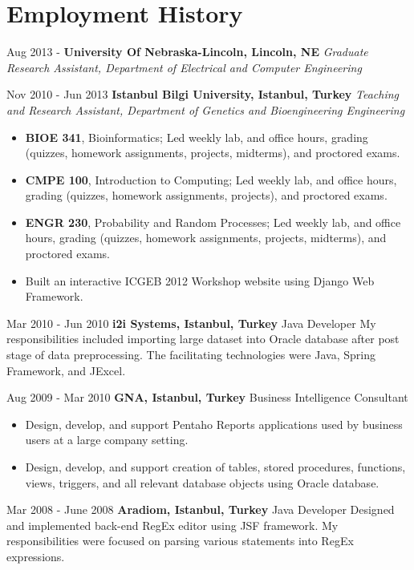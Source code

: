 \documentclass[showupdate]{xqcv}
\begin{document}
\section{Employment History}
\begin{entrylist}
  \hentry
  {Aug 2013 -}
  {\textbf{University Of Nebraska-Lincoln, Lincoln, NE}}
  {\textit{Graduate Research Assistant, Department of Electrical and Computer Engineering}}
  {}

  \hentry
  {Nov 2010 - Jun 2013}
  {\textbf{Istanbul Bilgi University, Istanbul, Turkey}}
  {\textit{Teaching and Research Assistant, Department of Genetics and Bioengineering Engineering}}
  {
    \begin{itemize}
      \item \textbf{BIOE 341}, Bioinformatics; Led weekly lab, and office hours, grading (quizzes, homework assignments, projects, midterms), and proctored exams.
      \item \textbf{CMPE 100}, Introduction to Computing; Led weekly lab, and office hours, grading (quizzes, homework assignments, projects), and proctored exams.
      \item \textbf{ENGR 230}, Probability and Random Processes; Led weekly lab, and office hours, grading (quizzes, homework assignments, projects, midterms), and proctored exams.
      \item Built an interactive ICGEB 2012 Workshop website using Django Web Framework.
    \end{itemize}
  }

  \hentry
  {Mar 2010 - Jun 2010}
  {\textbf{i2i Systems, Istanbul, Turkey}}
  {Java Developer}
  {My responsibilities included importing large dataset into Oracle database after post stage of data preprocessing. The facilitating technologies were Java, Spring Framework, and JExcel.}

  \hentry
  {Aug 2009 - Mar 2010}
  {\textbf{GNA, Istanbul, Turkey}}
  {Business Intelligence Consultant}
  {
    \begin{itemize}
      \item Design, develop, and support Pentaho Reports applications used by business users at a large company setting.
      \item Design, develop, and support creation of tables, stored procedures, functions, views, triggers, and all relevant database objects using Oracle database.
    \end{itemize}
  }
  
  \hentry
  {Mar 2008 - June 2008}
  {\textbf{Aradiom, Istanbul, Turkey}}
  {Java Developer}
  {
    Designed and implemented back-end RegEx editor using JSF framework. My responsibilities were focused on parsing various statements into RegEx expressions.
  }

\end{entrylist}
\end{document}
